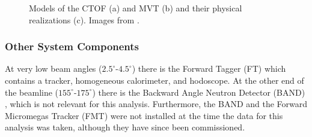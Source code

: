         \begin{figure}[H]
            \centering
            \hfill
            \hfill
            \caption[Central Detector Packages]{Models of the CTOF (a) and MVT (b) and their physical realizations (c). Images from \parencite{Burkert2020TheLaboratory}.}
            \label{fig:your_labels}
        \end{figure}
     
        

\subsubsection*{Other System Components}

    At very low beam angles ($2.5^{\circ}$-$4.5^{\circ}$) there is the Forward Tagger (FT)  which contains a tracker, homogeneous calorimeter, and hodoscope. At the other end of the beamline ($155^{\circ}$-$175^{\circ}$) there is the Backward Angle Neutron Detector (BAND)  \parencite{Segarra2020TheBAND}, which is not relevant for this analysis. Furthermore, the BAND and the Forward Micromegas Tracker (FMT)  \parencite{Acker2020TheTracker}   were not installed at the time the data for this analysis was taken, although they have since been commissioned. 
    
